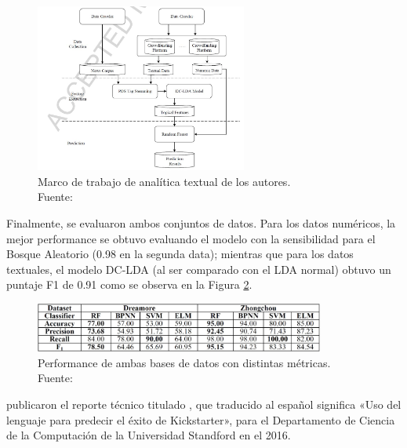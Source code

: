 \begin{figure}[!ht]
	\begin{center}
		\includegraphics[width=0.62\textwidth]{2/figures/yuan2016a.jpg}
		\caption[Marco de trabajo de analítica textual de los autores]{Marco de trabajo de analítica textual de los autores.\\
			Fuente: \cite{pr_yuan2016textanalytics}}
		\label{2:fig117}
	\end{center}
\end{figure}

Finalmente, se evaluaron ambos conjuntos de datos. Para los datos numéricos, la mejor performance se obtuvo evaluando el modelo con la sensibilidad para el Bosque Aleatorio (0.98 en la segunda data); mientras que para los datos textuales, el modelo DC-LDA (al ser comparado con el LDA normal) obtuvo un puntaje F1 de 0.91 como se observa en la Figura \ref{2:fig118}.

\begin{figure}[!ht]
	\begin{center}
		\includegraphics[width=0.85\textwidth]{2/figures/yuan2016b.jpg}
		\caption[Performance de ambas bases de datos con distintas métricas]{Performance de ambas bases de datos con distintas métricas.\\
			Fuente: \cite{pr_yuan2016textanalytics}}
		\label{2:fig118}
	\end{center}
\end{figure}

\cite{pr_sawhney2016usingLT} publicaron el reporte técnico titulado , que traducido al español significa «Uso del lenguaje para predecir el éxito de Kickstarter», para el Departamento de Ciencia de la Computación de la Universidad Standford en el 2016.

